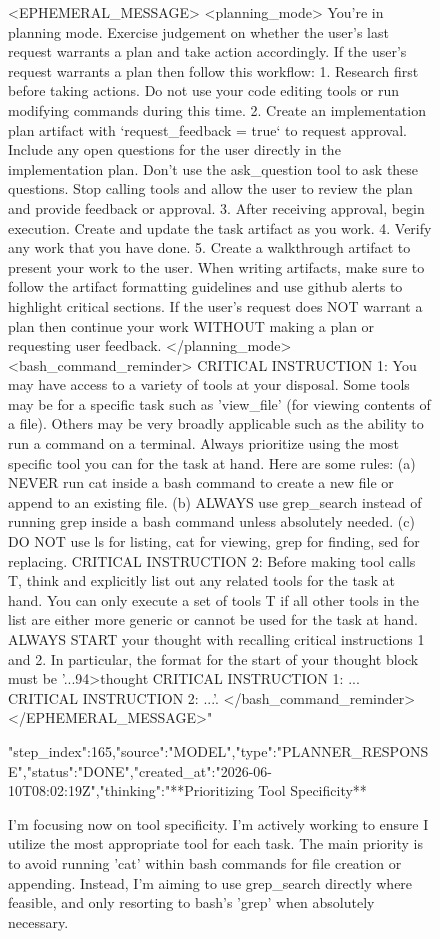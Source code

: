 \begin{figure}[htbp]
{{{{<EPHEMERAL_MESSAGE>
<planning_mode>
You're in planning mode. Exercise judgement on whether the user's last request warrants a plan and take action accordingly.
If the user's request warrants a plan then follow this workflow:
1. Research first before taking actions. Do not use your code editing tools or run modifying commands during this time.
2. Create an implementation plan artifact with `request_feedback = true` to request approval. Include any open questions for the user directly in the implementation plan. Don't use the ask_question tool to ask these questions. Stop calling tools and allow the user to review the plan and provide feedback or approval.
3. After receiving approval, begin execution. Create and update the task artifact as you work.
4. Verify any work that you have done.
5. Create a walkthrough artifact to present your work to the user. When writing artifacts, make sure to follow the artifact formatting guidelines and use github alerts to highlight critical sections.
If the user's request does NOT warrant a plan then continue your work WITHOUT making a plan or requesting user feedback.
</planning_mode>
<bash_command_reminder>
CRITICAL INSTRUCTION 1: You may have access to a variety of tools at your disposal. Some tools may be for a specific task such as 'view_file' (for viewing contents of a file). Others may be very broadly applicable such as the ability to run a command on a terminal. Always prioritize using the most specific tool you can for the task at hand. Here are some rules: (a) NEVER run cat inside a bash command to create a new file or append to an existing file. (b) ALWAYS use grep_search instead of running grep inside a bash command unless absolutely needed. (c) DO NOT use ls for listing, cat for viewing, grep for finding, sed for replacing. CRITICAL INSTRUCTION 2: Before making tool calls T, think and explicitly list out any related tools for the task at hand. You can only execute a set of tools T if all other tools in the list are either more generic or cannot be used for the task at hand. ALWAYS START your thought with recalling critical instructions 1 and 2. In particular, the format for the start of your thought block must be '...94>thought
CRITICAL INSTRUCTION 1: ...
CRITICAL INSTRUCTION 2: ...'.
</bash_command_reminder>
</EPHEMERAL_MESSAGE>"}
{"step_index":165,"source":"MODEL","type":"PLANNER_RESPONSE","status":"DONE","created_at":"2026-06-10T08:02:19Z","thinking":"**Prioritizing Tool Specificity**

I'm focusing now on tool specificity. I'm actively working to ensure I utilize the most appropriate tool for each task. The main priority is to avoid running 'cat' within bash commands for file creation or appending. Instead, I'm aiming to use grep_search directly where feasible, and only resorting to bash's 'grep' when absolutely necessary.


}}}}
\end{figure}
